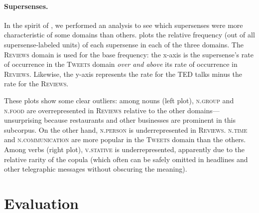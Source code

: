 \documentclass[11pt,letterpaper]{article}
\newcommand{\ensuretext}[1]{#1}
\newcommand{\nssmarker}{\ensuretext{\textcolor{magenta}{\ensuremath{^{\textsc{NS}}_{\textsc{S}}}}}}
\newcommand{\arkcomment}[3]{\ensuretext{\textcolor{#3}{[#1 #2]}}}
\newcommand{\nss}[1]{\arkcomment{\nssmarker}{#1}{magenta}}
\newcommand{\sst}[1]{\textsc{#1}} %
\newcommand{\dataset}[1]{\mbox{\textsc{#1}}}	%
\newcommand{\finalversion}[1]{}
\newcommand{\longversion}[1]{#1} %
\begin{document}
\paragraph{Supersenses.} In the spirit of \citet{schneider-12}, we performed an analysis to see 
which supersenses were more characteristic of some domains than others. 
 plots the relative frequency (out of all supersense-labeled units) 
of each supersense in each of the three domains. The \dataset{Reviews} domain is used for the base frequency: 
the x-axis is the supersense's rate of occurrence in the \dataset{Tweets} domain \emph{over and above} 
its rate of occurrence in \dataset{Reviews}. Likewise, the y-axis represents the rate for the \dataset{TED} talks 
minus the rate for the \dataset{Reviews}. 

These plots show some clear outliers: among nouns (left plot), 
\sst{n.group} and \sst{n.food} are overrepresented in \dataset{Reviews} 
relative to the other domains---unsurprising because restaurants and other businesses are prominent in this subcorpus.
On the other hand, \sst{n.person} is underrepresented in \dataset{Reviews}. 
\sst{n.time} and \sst{n.communication} are more popular in the \dataset{Tweets} domain than the others.
Among verbs (right plot), \sst{v.stative} is underrepresented, apparently due to the relative rarity of 
the copula (which often can be safely omitted in headlines and other telegraphic messages 
without obscuring the meaning).

\section{Evaluation}\label{sec:eval}
\longversion{
\finalversion{\subsection{\nss{TODO}System Submission Process}

On May~5,~2015, teams will be furnished with the test data (minus the gold labels). 
They will have until May~10 to submit up to 3~system predictions for evaluation. 
The test data will include sentences from both evaluation domains, 
in a random order: to encourage robust systems, 
the domain of each sentence will not be marked at test time, 
and the proportion of sentences from each domain is not guaranteed to be 
the same in the trial, train, dev, and test sets.\nss{is this crazy?}}
}
\end{document}
